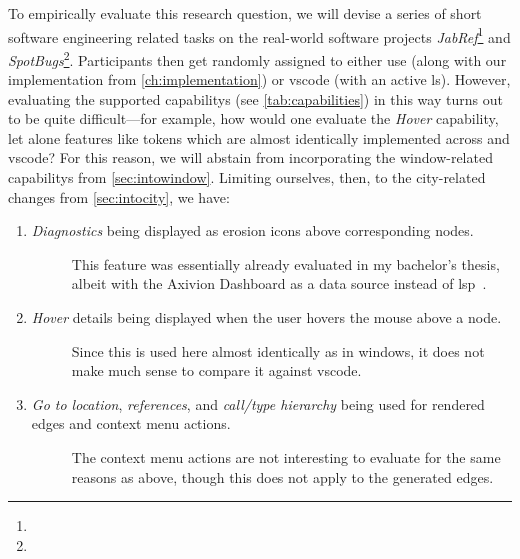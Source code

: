 \documentclass[../thesis]{subfiles}
\begin{document}
To empirically evaluate this research question, we will devise a series of short software engineering related tasks on the real-world software projects \emph{JabRef}\footnote{
} and \emph{SpotBugs}\footnote{
}.
Participants then get randomly assigned to either use \SEE{} (along with our implementation from \cref{ch:implementation}) or \gls{vscode} (with an active \gls{ls}).
However, evaluating the supported \glspl{capability} (see \cref{tab:capabilities}) in this way turns out to be quite difficult---for example, how would one evaluate the \emph{Hover} \gls{capability}, let alone features like \glspl{token} which are almost identically implemented across \SEE{} and \gls{vscode}?
For this reason, we will abstain from incorporating the \gls{window}-related \glspl{capability} from \cref{sec:intowindow}.
Limiting ourselves, then, to the \gls{city}-related changes from \cref{sec:intocity}, we have:
\begin{enumerate}
	\item \emph{Diagnostics} being displayed as erosion icons above corresponding nodes.
	      \begin{description}
		      \item[\follows{}] This feature was essentially already evaluated in my bachelor's thesis, albeit with the Axivion Dashboard as a data source instead of \gls{lsp}~\cite{galperin2021,galperin2022}.
	      \end{description}
	\item \emph{Hover} details being displayed when the user hovers the mouse above a node.
	      \begin{description}
		      \item[\follows{}] Since this is used here almost identically as in \glspl{window}, it does not make much sense to compare it against \gls{vscode}.
	      \end{description}
	\item \emph{Go to location}, \emph{references}, and \emph{call/type hierarchy} being used for rendered edges and context menu actions.
	      \begin{description}
		      \item[\follows{}] The context menu actions are not interesting to evaluate for the same reasons as above, though this does not apply to the generated edges.
	      \end{description}
\end{enumerate}
\end{document}

